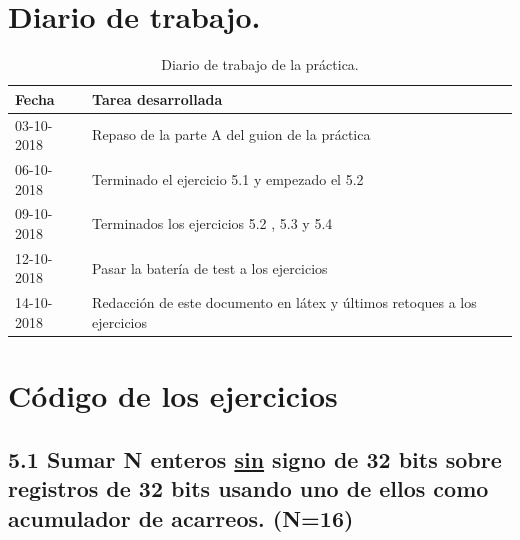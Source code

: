 	\tableofcontents %
	
	\listoffigures %
	
	\listoftables %
	
	\newpage
	
	\section[Diario de trabajo]{Diario de trabajo.}
		
	\begin{table}[htbp]
		\begin{center}
			\begin{tabular}{|l|l|}
				\hline
				Fecha & Tarea desarrollada \\
				\hline \hline
				03-10-2018 & Repaso de la parte A del guion de la práctica \\ \hline
				06-10-2018 & Terminado el ejercicio 5.1 y empezado el 5.2 \\ \hline
				09-10-2018 & Terminados los ejercicios 5.2 , 5.3 y 5.4 \\ \hline
				12-10-2018 & Pasar la batería de test a los ejercicios \\ \hline
				14-10-2018 & Redacción de este documento en látex y últimos retoques a los ejercicios \\ \hline
			\end{tabular}
			\caption{Diario de trabajo de la práctica.}
			\label{tabla:sencilla}
		\end{center}
	\end{table}
	
	\section[Código de los ejercicios]{Código de los ejercicios}
	
	
	\subsection{5.1 Sumar N enteros \underline{sin}  signo de 32 bits sobre registros de 32 bits usando uno de ellos como acumulador de acarreos. (N=16)}
	
